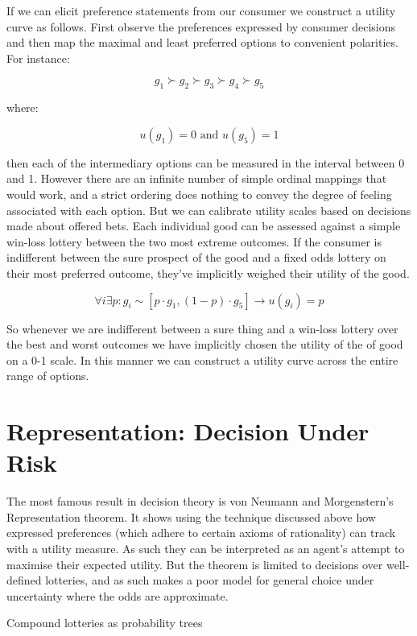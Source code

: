 \documentclass{tufte-handout}
\begin{document}
If we can elicit preference statements from our consumer we construct a utility curve as follows. First observe the preferences expressed by consumer decisions and then map the maximal and least preferred options to convenient polarities. For instance:

$$ g_{1} \succ g_{2} \succ g_{3} \succ g_{4} \succ g_{5} $$

\noindent where:

$$ u(g_{1}) = 0 \text{ and } u(g_{5}) = 1 $$

\noindent then each of the intermediary options can be measured in the interval between 0 and 1. However there are an infinite number of simple ordinal mappings that would work, and a strict ordering does nothing to convey the degree of feeling associated with each option. But we can calibrate utility scales based on decisions made about offered bets. Each individual good can be assessed against a simple win-loss lottery between the two most extreme outcomes. If the consumer is indifferent between the sure prospect of the good and a fixed odds lottery on their most preferred outcome, they've implicitly weighed their utility of the good. 

$$ \forall i \exists  p :  g _{i} \sim [p \cdot g_{1}, (1-p)\cdot g_{5}] \rightarrow u(g_{i}) = p $$

\noindent So whenever we are indifferent between a sure thing and a win-loss lottery over the best and worst outcomes we have implicitly chosen the utility of the of good on a 0-1 scale. In this manner we can construct a utility curve across the entire range of options. 

\section{Representation: Decision Under Risk}
The most famous result in decision theory is von Neumann and Morgenstern's Representation theorem. It shows using the technique discussed above how expressed preferences (which adhere to certain axioms of rationality) can track with a utility measure.  As such they can be interpreted as an agent's attempt to maximise their expected utility.  But the theorem is limited to decisions over well-defined lotteries, and as such makes a poor model for general choice under uncertainty where the odds are approximate. 

\begin{marginfigure}
\caption{Compound lotteries as probability trees}%
  
  \label{fig:compound lotteries}%
\end{marginfigure}
\end{document}
